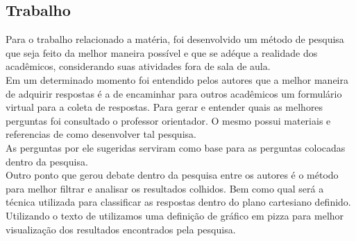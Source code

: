 \documentclass[12pt]{article}
\begin{document}
\subsection{Trabalho}
Para o trabalho relacionado a matéria, foi desenvolvido um método de pesquisa que seja feito da melhor maneira possível e que se adéque a realidade dos acadêmicos, considerando suas atividades fora de sala de aula.
\\Em um determinado momento foi entendido pelos autores que a melhor maneira de adquirir respostas é a de encaminhar para outros acadêmicos um formulário virtual para a coleta de respostas. Para gerar e entender quais as melhores perguntas foi consultado o professor orientador. O mesmo possui materiais e referencias de como desenvolver tal pesquisa.
\\As perguntas por ele sugeridas serviram como base para as perguntas colocadas dentro da pesquisa.
\\Outro ponto que gerou debate dentro da pesquisa  entre os autores é o método para melhor filtrar e analisar os resultados colhidos. Bem como qual será a técnica utilizada para classificar as respostas dentro do plano cartesiano definido.
\\Utilizando o texto de \cite{Russo_Silva_Larieira_2021} utilizamos uma definição de gráfico em pizza para melhor visualização dos resultados encontrados pela pesquisa.
\end{document}
